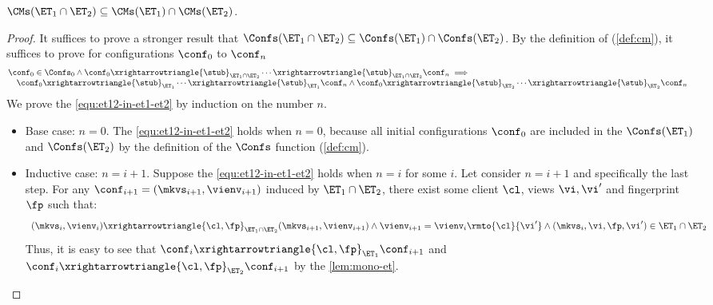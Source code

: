 \begin{lemma}
\label{lem:et12-in-et1-et2}
\( \CMs(\ET_{1} \cap \ET_{2}) \subseteq \CMs(\ET_1) \cap \CMs(\ET_2) \).
\end{lemma}
\begin{proof}
It suffices to prove a stronger result that \( \Confs(\ET_{1} \cap \ET_{2}) \subseteq \Confs(\ET_1) \cap \Confs(\ET_2) \).
By the definition of \Confs (\cref{def:cm}), it suffices to prove for configurations \( \conf_0 \) to \( \conf_n \) 
\begin{equation}
    \label{equ:et12-in-et1-et2}
    \begin{array}{@{}l}
        \conf_0 \in \Confs_0
    \land \conf_0 \xrightarrowtriangle{\stub}_{\ET_1 \cap \ET_2} \cdots \xrightarrowtriangle{\stub}_{\ET_1 \cap \ET_2} \conf_n \implies {} \\
    \quad \conf_0 \xrightarrowtriangle{\stub}_{\ET_{1}} \cdots \xrightarrowtriangle{\stub}_{\ET_{1}} \conf_n \land \conf_0 \xrightarrowtriangle{\stub}_{\ET_{2}} \cdots \xrightarrowtriangle{\stub}_{\ET_{2}} \conf_n 
    \end{array}
\end{equation}
We prove the \cref{equ:et12-in-et1-et2} by induction on the number \( n \).
\begin{itemize}
\item Base case: \(n = 0\). 
The \cref{equ:et12-in-et1-et2} holds when \( n = 0 \), because all initial configurations \( \conf_0 \) are included in the \( \Confs(\ET_1)\) and \( \Confs(\ET_2) \) by the definition of the \( \Confs \) function (\cref{def:cm}).

\item Inductive case: \(n = i+1\). Suppose the \cref{equ:et12-in-et1-et2} holds when \( n = i \) for some \( i \).
Let consider \( n = i + 1 \) and specifically the last step.
For any \( \conf_{i+1} = (\mkvs_{i+1}, \vienv_{i+1}) \) induced by \( \ET_{1} \cap \ET_2 \), 
there exist some client \( \cl \), views \( \vi, \vi' \) and fingerprint \( \fp \) such that:
\[
    \begin{array}{l}
    (\mkvs_i, \vienv_i) \xrightarrowtriangle{\cl, \fp}_{\ET_{1} \cap \ET_{2}} (\mkvs_{i+1}, \vienv_{i+1}) 
    \land \vienv_{i+1} = \vienv_{i}\rmto{\cl}{\vi'} \land (\mkvs_i, \vi, \fp, \vi' ) \in \ET_{1} \cap \ET_{2}
    \end{array}
\]
Thus, it is easy to see that \( \conf_i \xrightarrowtriangle{\cl, \fp}_{\ET_{1}} \conf_{i+1} \) and \( \conf_i \xrightarrowtriangle{\cl, \fp}_{\ET_{2}} \conf_{i+1} \) by the \cref{lem:mono-et}.
\end{itemize}
\end{proof}


